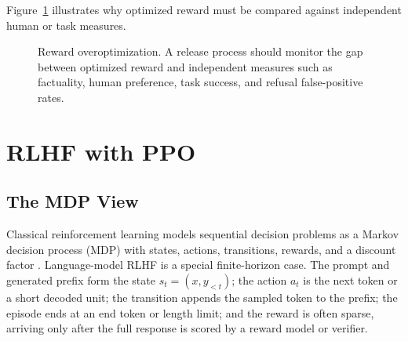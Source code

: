 Figure~\ref{fig:reward-overoptimization} illustrates why optimized reward must be compared against independent human or task measures.

\begin{figure}[t]
\centering
{}
\caption{Reward overoptimization. A release process should monitor the gap between optimized reward and independent measures such as factuality, human preference, task success, and refusal false-positive rates.}
\label{fig:reward-overoptimization}
\end{figure}

\section{RLHF with PPO}
\subsection{The MDP View}
Classical reinforcement learning models sequential decision problems as a Markov decision process (MDP) with states, actions, transitions, rewards, and a discount factor \cite{sutton2018reinforcement}. Language-model RLHF is a special finite-horizon case. The prompt and generated prefix form the state $s_t=(x,y_{<t})$; the action $a_t$ is the next token or a short decoded unit; the transition appends the sampled token to the prefix; the episode ends at an end token or length limit; and the reward is often sparse, arriving only after the full response is scored by a reward model or verifier.

